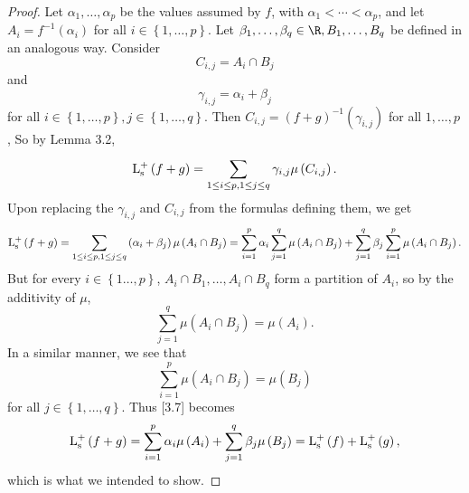 \documentclass[pmath450]{subfiles}
\begin{document}
    \begin{proof}
        Let $\alpha_1,\ldots,\alpha_p$ be the values assumed by $f$, with $\alpha_1<\cdots<\alpha_p$, and let $A_i=f^{-1}\left( \alpha_i \right)$ for all $i\in\left\lbrace 1,\ldots,p \right\rbrace$. Let $\beta_1,\ldots,\beta_q\in\R, B_1,\ldots,B_q$ be defined in an analogous way. Consider
        \begin{equation*}
            C_{i,j} = A_i\cap B_j
        \end{equation*}
        and
        \begin{equation*}
            \gamma_{i,j} = \alpha_i+\beta_j
        \end{equation*}
        for all $i\in\left\lbrace 1,\ldots,p \right\rbrace,j\in\left\lbrace 1,\ldots,q \right\rbrace$. Then $C_{i,j} = \left( f+g \right)^{-1}\left( \gamma_{i,j} \right)$ for all $1,\ldots,p$, So by Lemma 3.2,
        \begin{equation*}
            \operatorname{L^+_s}\left( f+g \right) = \sum^{}_{1\leq i\leq p, 1\leq j\leq q} \gamma_{i,j}\mu\left( C_{i,j} \right).
        \end{equation*}
        Upon replacing the $\gamma_{i,j}$ and $C_{i,j}$ from the formulas defining them, we get
        \begin{equation}
            \operatorname{L^+_s}\left( f+g \right) = \sum^{}_{1\leq i\leq p, 1\leq j\leq q} \left( \alpha_i+\beta_j \right)\mu\left( A_i\cap B_j \right) = \sum^{p}_{i=1}\alpha_i\sum^{q}_{j=1}\mu\left( A_i\cap B_j \right) + \sum^{q}_{j=1}\beta_j\sum^{p}_{i=1}\mu\left( A_i\cap B_j \right).
        \end{equation}
        But for every $i\in\left\lbrace 1\ldots,p \right\rbrace$, $A_i\cap B_1,\ldots,A_i\cap B_q$ form a partition of $A_i$, so by the additivity of $\mu$,
        \begin{equation*}
            \sum^{q}_{j=1}\mu\left( A_i\cap B_j \right)=\mu\left( A_i \right).
        \end{equation*}
        In a similar manner, we see that
        \begin{equation*}
            \sum^{p}_{i=1}\mu\left( A_i\cap B_j \right)=\mu\left( B_j \right)
        \end{equation*}
        for all $j\in\left\lbrace 1,\ldots,q \right\rbrace$. Thus [3.7] becomes
        \begin{equation*}
            \operatorname{L^+_s}\left( f+g \right) = \sum^{p}_{i=1}\alpha_i\mu\left( A_i \right) + \sum^{q}_{j=1}\beta_j\mu\left( B_j \right) = \operatorname{L^+_s}\left( f \right)+\operatorname{L^+_s}\left( g \right),
        \end{equation*}
        which is what we intended to show.
    \end{proof}
\end{document}
